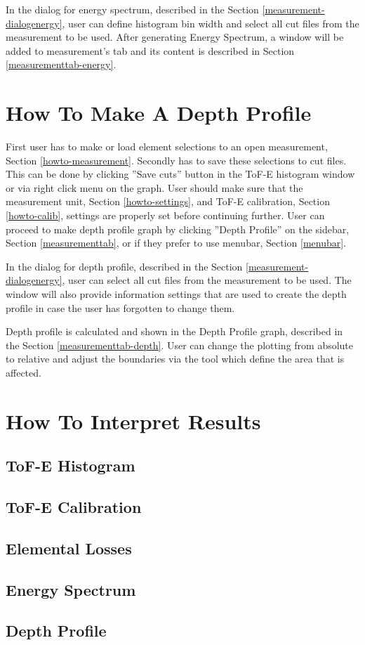 \documentclass{scrreprt}
\begin{document}
In the dialog for energy spectrum, described in the Section \ref{measurement-dialogenergy}, user can define histogram bin width and select all cut files from the measurement to be used.
After generating Energy Spectrum, a window will be added to measurement's tab and its content is described in Section \ref{measurementtab-energy}.


\section{How To Make A Depth Profile}\label{howto-depth}
First user has to make or load element selections to an open measurement, Section \ref{howto-measurement}.
Secondly has to save these selections to cut files. This can be done by clicking ''Save cuts'' button in the ToF-E histogram window or via right click menu on the graph.
User should make sure that the measurement unit, Section \ref{howto-settings}, and ToF-E calibration, Section \ref{howto-calib}, settings are properly set before continuing further.
User can proceed to make depth profile graph by clicking ''Depth Profile'' on the sidebar, Section \ref{measurementtab}, or if they prefer to use menubar, Section \ref{menubar}.

In the dialog for depth profile, described in the Section \ref{measurement-dialogenergy}, user can select all cut files from the measurement to be used.
The window will also provide information settings that are used to create the depth profile in case the user has forgotten to change them.

Depth profile is calculated and shown in the Depth Profile graph, described in the Section \ref{measurementtab-depth}.
User can change the plotting from absolute to relative and adjust the boundaries via the tool which define the area that is affected.


\section{How To Interpret Results}\label{howto-result}
\subsection{ToF-E Histogram}\label{howto-result-tofe}
\subsection{ToF-E Calibration}\label{howto-result-calib}
\subsection{Elemental Losses}\label{howto-result-elemloss}
\subsection{Energy Spectrum}\label{howto-result-energy}
\subsection{Depth Profile}\label{howto-result-depth}
\end{document}
